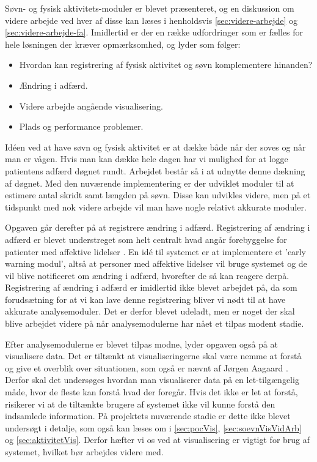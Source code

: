 Søvn- og fysisk aktivitets-moduler er blevet præsenteret, og en diskussion om videre arbejde ved hver af disse kan læses i henholdsvis \cref{sec:videre-arbejde} og \cref{sec:videre-arbejde-fa}.
Imidlertid er der en række udfordringer som er fælles for hele løsningen der kræver opmærksomhed, og lyder som følger:
\begin{itemize}
	\item Hvordan kan registrering af fysisk aktivitet og søvn komplementere hinanden?
	\item Ændring i adfærd.
	\item Videre arbejde angående visualisering.
	\item Plads og performance problemer.
\end{itemize}

Idéen ved at have søvn og fysisk aktivitet er at dække både når der soves og når man er vågen.
Hvis man kan dække hele dagen har vi mulighed for at logge patientens adfærd døgnet rundt.
Arbejdet består så i at udnytte denne dækning af døgnet.
Med den nuværende implementering er der udviklet moduler til at estimere antal skridt samt længden på søvn.
Disse kan udvikles videre, men på et tidspunkt med nok videre arbejde vil man have nogle relativt akkurate moduler.

Opgaven går derefter på at registrere ændring i adfærd. 
Registrering af ændring i adfærd er blevet understreget som helt centralt hvad angår forebyggelse for patienter med affektive lidelser \citep[Kapitel 1, Sektion 4]{misc:faellesrapp}.
En idé til systemet er at implementere et 'early warning modul', altså at personer med affektive lidelser vil bruge systemet og de vil blive notificeret om ændring i adfærd, hvorefter de så kan reagere derpå. 
Registrering af ændring i adfærd er imidlertid ikke blevet arbejdet på, da som forudsætning for at vi kan lave denne registrering bliver vi nødt til at have akkurate analysemoduler.
Det er derfor blevet udeladt, men er noget der skal blive arbejdet videre på når analysemodulerne har nået et tilpas modent stadie.

Efter analysemodulerne er blevet tilpas modne, lyder opgaven også på at visualisere data.
Det er tiltænkt at visualiseringerne skal være nemme at forstå og give et overblik over situationen, som også er nævnt af Jørgen Aagaard \citep[Kapitel 1, Sektion 4]{misc:faellesrapp}. 
Derfor skal det undersøges hvordan man visualiserer data på en let-tilgængelig måde, hvor de fleste kan forstå hvad der foregår. 
Hvis det ikke er let at forstå, risikerer vi at de tiltænkte brugere af systemet ikke vil kunne forstå den indsamlede information.
På projektets nuværende stadie er dette ikke blevet undersøgt i detalje, som også kan læses om i \cref{sec:pocVis}, \cref{sec:soevnVisVidArb} og \cref{sec:aktivitetVis}. 
Derfor hæfter vi os ved at visualisering er vigtigt for brug af systemet, hvilket bør arbejdes videre med.

